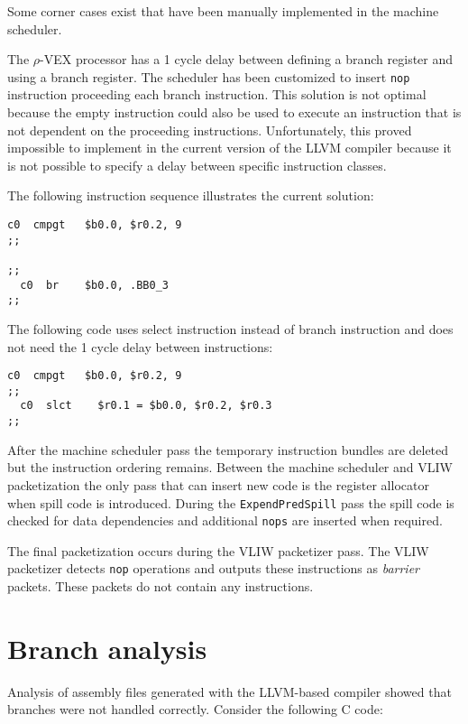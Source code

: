 Some corner cases exist that have been manually implemented in the machine scheduler.

The $\rho$-VEX processor has a 1 cycle delay between defining a branch register and using a branch register. The scheduler has been customized to insert \texttt{nop} instruction proceeding each branch instruction. This solution is not optimal because the empty instruction could also be used to execute an instruction that is not dependent on the proceeding instructions. Unfortunately, this proved impossible to implement in the current version of the LLVM compiler because it is not possible to specify a delay between specific instruction classes.

The following instruction sequence illustrates the current solution: 

\begin{lstlisting}[language=rvex]
  c0  cmpgt   $b0.0, $r0.2, 9
;;

;;
  c0  br    $b0.0, .BB0_3
;;
\end{lstlisting}

The following code uses select instruction instead of branch instruction and does not need the 1 cycle delay between instructions:

\begin{lstlisting}[language=rvex]
  c0  cmpgt   $b0.0, $r0.2, 9
;;
  c0  slct    $r0.1 = $b0.0, $r0.2, $r0.3 
;;
\end{lstlisting}

After the machine scheduler pass the temporary instruction bundles are deleted but the instruction ordering remains. Between the machine scheduler and VLIW packetization the only pass that can insert new code is the register allocator when spill code is introduced. During the \texttt{ExpendPredSpill} pass the spill code is checked for data dependencies and additional \texttt{nops} are inserted when required.

The final packetization occurs during the VLIW packetizer pass. The VLIW packetizer detects \texttt{nop} operations and outputs these instructions as \emph{barrier} packets. These packets do not contain any instructions.



\section{Branch analysis}
Analysis of assembly files generated with the LLVM-based compiler showed that branches were not handled correctly. Consider the following C code:

